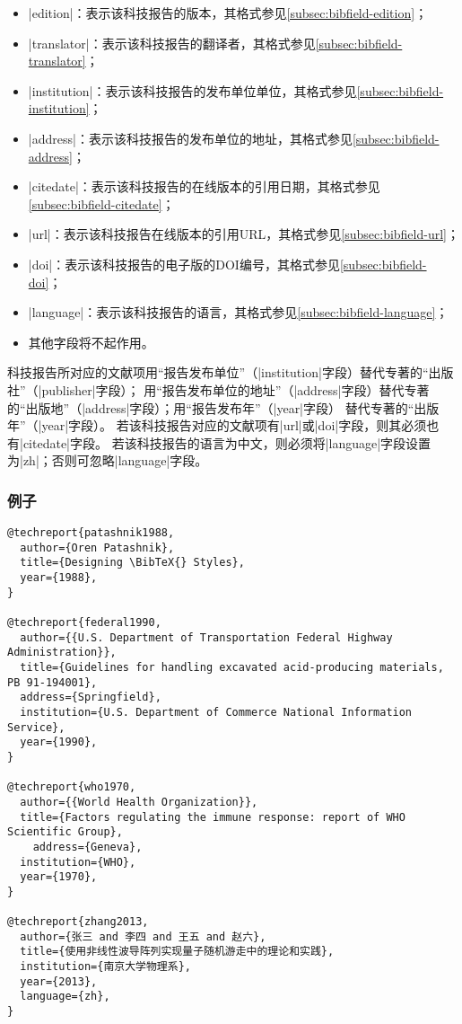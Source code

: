 \begin{itemize}
\item |edition|：表示该科技报告的版本，其格式参见\ref{subsec:bibfield-edition}；
\item |translator|：表示该科技报告的翻译者，其格式参见\ref{subsec:bibfield-translator}；
\item |institution|：表示该科技报告的发布单位单位，其格式参见\ref{subsec:bibfield-institution}；
\item |address|：表示该科技报告的发布单位的地址，其格式参见\ref{subsec:bibfield-address}；
\item |citedate|：表示该科技报告的在线版本的引用日期，其格式参见\ref{subsec:bibfield-citedate}；
\item |url|：表示该科技报告在线版本的引用URL，其格式参见\ref{subsec:bibfield-url}；
\item |doi|：表示该科技报告的电子版的DOI编号，其格式参见\ref{subsec:bibfield-doi}；
\item |language|：表示该科技报告的语言，其格式参见\ref{subsec:bibfield-language}；
\item 其他字段将不起作用。
\end{itemize}

\begin{note}
科技报告所对应的文献项用“报告发布单位”（|institution|字段）替代专著的“出版社”（|publisher|字段）；
用“报告发布单位的地址”（|address|字段）替代专著的“出版地”（|address|字段）；用“报告发布年”（|year|字段）
替代专著的“出版年”（|year|字段）。
若该科技报告对应的文献项有|url|或|doi|字段，则其必须也有|citedate|字段。
若该科技报告的语言为中文，则必须将|language|字段设置为|zh|；否则可忽略|language|字段。
\end{note}

\subsubsection{例子}

\begin{verbatim}
@techreport{patashnik1988,
  author={Oren Patashnik},
  title={Designing \BibTeX{} Styles},
  year={1988},
}

@techreport{federal1990,
  author={{U.S. Department of Transportation Federal Highway Administration}},
  title={Guidelines for handling excavated acid-producing materials, PB 91-194001},
  address={Springfield},
  institution={U.S. Department of Commerce National Information Service},
  year={1990},
}

@techreport{who1970,
  author={{World Health Organization}},
  title={Factors regulating the immune response: report of WHO Scientific Group},
    address={Geneva},
  institution={WHO},
  year={1970},
}

@techreport{zhang2013,
  author={张三 and 李四 and 王五 and 赵六},
  title={使用非线性波导阵列实现量子随机游走中的理论和实践},
  institution={南京大学物理系},
  year={2013},
  language={zh},
}
\end{verbatim}

